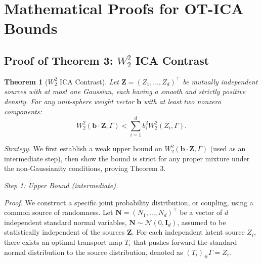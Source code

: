 \documentclass{tpm2026} %
\newtheorem{theorem}{Theorem}
\begin{document}
\section{Mathematical Proofs for OT-ICA Bounds}
\label{app:proofs}

\subsection{Proof of Theorem 3: $W_2^2$ ICA Contrast}

\setcounter{theorem}{2}
\begin{theorem}[$W_2^2$ ICA Contrast]
Let $\mathbf{Z} = (Z_1, \dots, Z_d)^\top$ be mutually independent sources with at most one Gaussian, each having a smooth and strictly positive density. For any unit-sphere weight vector $\mathbf{b}$ with at least two nonzero components:
\begin{equation}
    W_2^2(\mathbf{b} \cdot \mathbf{Z}, \Gamma) < \sum_{i=1}^d b_i^2 W_2^2(Z_i, \Gamma).
\end{equation}
\end{theorem}

\textit{Strategy.} We first establish a weak upper bound on $W_2^2(\mathbf{b}\cdot\mathbf{Z},\Gamma)$ (used as an intermediate step), then show the bound is strict for any proper mixture under the non-Gaussianity conditions, proving Theorem 3.

\medskip\noindent\textit{Step 1: Upper Bound (intermediate).}

\textit{Proof.} We construct a specific joint probability distribution, or coupling, using a common source of randomness. 
Let $\mathbf{N} = (N_1, \dots, N_d)^\top$ be a vector of $d$ independent standard normal variables, $\mathbf{N} \sim \mathcal{N}(0, \mathbf{I}_d)$, 
assumed to be statistically independent of the sources $\mathbf{Z}$. For each independent latent source $Z_i$, there exists 
an optimal transport map $T_i$ that pushes forward the standard normal distribution to the source distribution, denoted as $(T_i)_{\#} \Gamma = Z_i$. 
\end{document}
